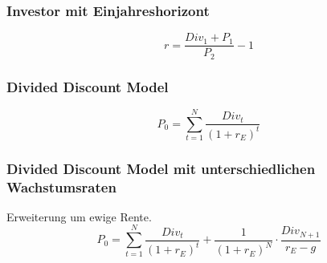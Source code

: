 \subsubsection{Investor mit Einjahreshorizont}
\[r = \frac{Div_1+P_1}{P_2}-1\]

\subsubsection{Divided Discount Model}
\[P_0 = \sum_{t=1}^{N} \frac{Div_t}{(1+r_E)^t}\]

\subsubsection{Divided Discount Model mit unterschiedlichen Wachstumsraten}
Erweiterung um ewige Rente.
\[P_0 = \sum_{t=1}^{N} \frac{Div_t}{(1+r_E)^t} + \frac{1}{(1+r_E)^N}\cdot\frac{Div_{N+1}}{r_E-g}\]
